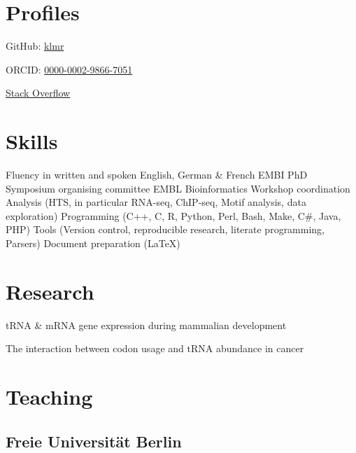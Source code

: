 \documentclass{klmr-cv}
\newcommand*\csharp{C\#}
\newcommand*\cpp{C++}
\begin{document}
\begin{sidebar}
\date{2003}
\item{}

\section{Profiles}

\item{GitHub: \href{http://github.com/klmr}{klmr}}
\item{ORCID: \href{http://orcid.org/0000-0002-9866-7051}{0000-0002-9866-7051}}
\item{\href{http://stackoverflow.com/users/1968/konrad-rudolph}{Stack Overflow}}

\section{Skills}

\begin{itemize}
    \listitem Fluency in written and spoken English, German \& French
    \listitem EMBI PhD Symposium organising committee
    \listitem EMBL Bioinformatics Workshop coordination
    \listitem Analysis (HTS, in particular RNA-seq, ChIP-seq, Motif analysis,
        data exploration)
    \listitem Programming (\cpp, C, R, Python, Perl, Bash, Make, \csharp, Java, PHP)
    \listitem Tools (Version control, reproducible research, literate
        programming, Parsers)
    \listitem Document preparation (\LaTeX)
\end{itemize}

\end{sidebar}

\section{Research}

\date{2011--2014}
\item{tRNA \& mRNA gene expression during mammalian development}

\date{2014--2015}
\item{The interaction between codon usage and tRNA abundance in cancer}

\section{Teaching}

\subsection{Freie Universität Berlin}
\end{document}
